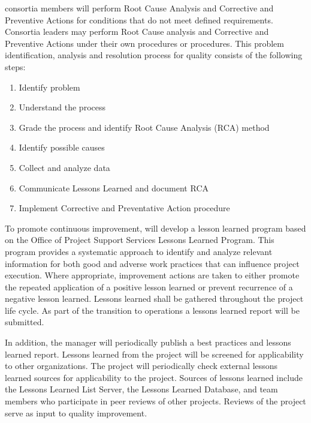  consortia members will perform Root Cause Analysis and
Corrective and Preventive Actions for conditions that do not meet
defined requirements. Consortia leaders may perform Root Cause
analysis and Corrective and Preventive Actions under their own
procedures or \fnal procedures.  This problem identification, analysis
and resolution process for quality consists of the following steps:
\begin{enumerate}
  \item Identify problem
  \item Understand the process
  \item Grade the process and identify Root Cause Analysis (RCA)
    method
  \item Identify possible causes
  \item Collect and analyze data
  \item Communicate Lessons Learned and document RCA
  \item Implement Corrective and Preventative Action procedure
\end{enumerate}


To promote continuous improvement,   will develop a
lesson learned program based on the \fnal Office of Project Support
Services Lessons Learned Program. This program provides a systematic
approach to identify and analyze relevant information for both good
and adverse work practices that can influence project execution. Where
appropriate, improvement actions are taken to either promote the
repeated application of a positive lesson learned or prevent
recurrence of a negative lesson learned. Lessons learned shall be
gathered throughout the project life cycle. As part of the transition
to operations a lessons learned report will be submitted.

In addition, the   manager will
periodically publish a best practices and lessons learned
report. Lessons learned from the  project will be screened
for applicability to other organizations. The  project
will periodically check external lessons learned sources for
applicability to the  project. Sources of lessons learned
include the  Lessons Learned List Server, the \fnal {}
Lessons Learned Database, and  team members who
participate in peer reviews of other projects. Reviews of the
 project serve as input to quality improvement.

